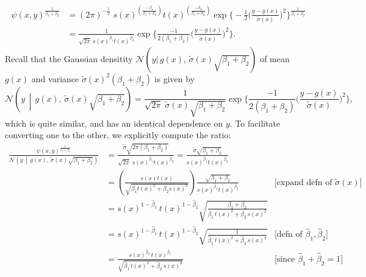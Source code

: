\begin{subappendices}
\begin{lproof}
	\begin{align*}
		\psi(x,y)^{\frac1{\beta_1+\beta_2}}
		&=
			(2\pi)^{-\frac12}\;
				s(x)^{\left(\frac{-\beta_1}{\beta_1+\beta_2}\right)}
			 	t(x)^{\left(\frac{-\beta_2}{\beta_1+\beta_2}\right)}
			\exp \bigg\{ -\!\frac12\Big(\frac{y-g(x)}{\tilde\sigma(x)}\Big)^2\bigg\}
				^{\frac1{\beta_1+\beta_2}} \\
		&= \frac{1}{ \sqrt{2\pi} \,
			s(x)^{\hat \beta_1} t(x)^{\hat \beta_2} }
			\exp \bigg\{ \frac{-1}{2(\beta_1+\beta_2)}\Big(\frac{y-g(x)}{\tilde\sigma(x)}\Big)^2\bigg\}.
	\end{align*}
	Recall that the Gaussian densitity $\mathcal N(y|\,g(x),\, \tilde\sigma(x) \sqrt{\beta_1+\beta_2})$ of mean $g(x)$ and variance $\tilde\sigma(x)^2(\beta_1+\beta_2)$ is given by
	\[ \mathcal N\left(y\,\middle|\,g(x),\, \tilde\sigma(x) \sqrt{\beta_1+\beta_2}\right)
		= \frac{1}{\sqrt{2\pi}\;\tilde\sigma(x) \sqrt{\beta_1+\beta_2}}
		\exp \bigg\{ \!\frac{-1}{2(\beta_1+\beta_2)}\Big(\frac{y-g(x)}{\tilde\sigma(x)}\Big)^2\bigg\},
		\]
	which is quite similar, and has an identical dependence on $y$.
	To facilitate converting one to the other, we explicitly compute the ratio:
	\begin{align*}
		\frac
			{\psi(x,y)^{\frac1{\beta_1+\beta_2}} }
			{\mathcal N\left(y\,\middle|\,g(x),\,
				\tilde\sigma(x)\sqrt{\beta_1+\beta_2}\right)}
		&= \frac
			{\tilde\sigma \sqrt{2\pi(\beta_1+\beta_2)}}
			{\sqrt{2\pi}\; s(x)^{\hat \beta_1} t(x) ^{\hat \beta_2}}
		= \frac
			{\tilde\sigma \sqrt{\beta_1+\beta_2}}
			{s(x)^{\hat \beta_1} t(x) ^{\hat \beta_2}} \\
		&=
		\left(\frac{s(x)t(x)}{\sqrt{\beta_1t(x)^2+\beta_2 s(x)^2}}\right)
		\frac
			{\sqrt{\beta_1+\beta_2}}
			{s(x)^{\hat \beta_1} t(x) ^{\hat \beta_2}}
	 &\text{[expand defn of $\tilde\sigma(x)$]}\\
		&= s(x)^{1-\hat\beta_1}\, t(x)^{1-\hat\beta_2}
			\sqrt{\frac
				{\beta_1+\beta_2}
				{\beta_1\,t(x)^2+\beta_2\,s(x)^2} } \\
		&= s(x)^{1-\hat\beta_1}\, t(x)^{1-\hat\beta_2}
			\sqrt{\frac1{
				\hat\beta_1\,t(x)^2+\hat\beta_2\,s(x)^2 }}
 	&\text{[defn of $\hat\beta_1, \hat\beta_2$]} \\
		&= \frac
			{ s(x)^{\hat\beta_2}\, t(x)^{\hat\beta_1} }
			{ \sqrt{
				\hat\beta_1\,t(x)^2+\hat\beta_2\,s(x)^2 } }
	& \text{[since $\hat\beta_1+\hat\beta_2=1$]}
	\end{align*}


\end{lproof}
\end{subappendices}
